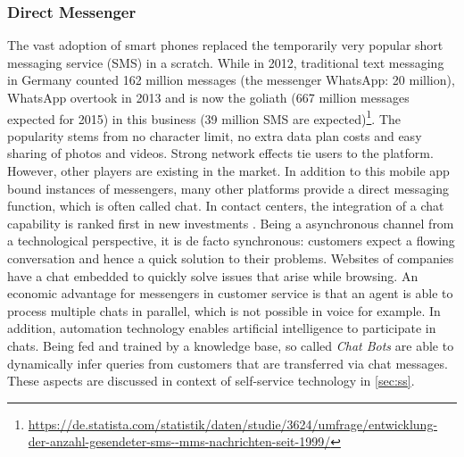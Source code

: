		\subsubsection{Direct Messenger}
		The vast adoption of smart phones replaced the temporarily very popular short messaging service (SMS) in a scratch.  While in 2012, traditional text messaging in Germany counted 162 million messages (the messenger WhatsApp: 20 million), WhatsApp overtook in 2013 and is now the goliath (667 million messages expected for 2015) in this business (39 million SMS are expected)\footnote{\cf \url{https://de.statista.com/statistik/daten/studie/3624/umfrage/entwicklung-  der-anzahl-gesendeter-sms--mms-nachrichten-seit-1999/}}. The popularity stems from no character limit, no extra data plan costs and easy sharing of photos and videos. Strong network effects tie users to the platform. However, other players are existing in the market. In addition to this mobile app bound instances of messengers, many other platforms provide a direct messaging function, which is often called chat. In contact centers, the integration of a chat capability is ranked first in new investments \citep{ccnet2016}. Being a asynchronous channel from a technological perspective, it is de facto synchronous: customers expect a flowing conversation and hence a quick solution to their problems. Websites of companies have a chat embedded to quickly solve issues that arise while browsing. An economic advantage for messengers in customer service is that an agent is able to process multiple chats in parallel, which is not possible in voice for example. In addition, automation technology enables artificial intelligence to participate in chats. Being fed and trained by a knowledge base, so called \textit{Chat Bots} are able to dynamically infer queries from customers that are transferred via chat messages. These aspects are discussed in context of self-service technology in \ref{sec:ss}.%
		
